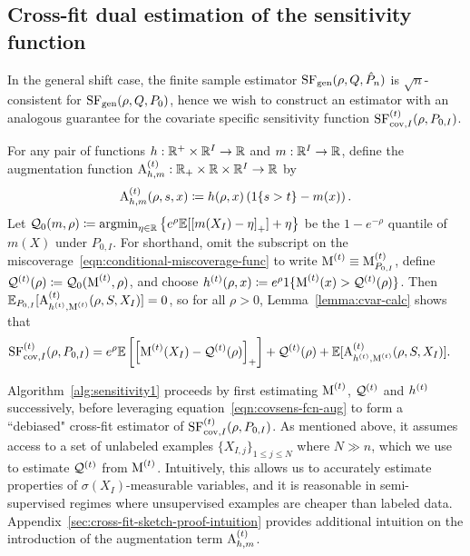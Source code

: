 \subsection{Cross-fit dual estimation of the sensitivity function}
\label{subsec:sens-f-inf-divergence}

In the general shift case, the finite sample estimator $\operatorname*{SF}_\text{gen}(\rho,Q,\hat{P}_n)$ is $\sqrt{n}$-consistent for $\operatorname*{SF}_\text{gen}(\rho,Q,P_0)$,  hence we wish to construct an estimator with an analogous guarantee for the covariate specific sensitivity function ${\operatorname*{SF}}_{\textup{cov}, I}^{(t)}(\rho, P_{0,I})$.

For any pair of functions $h : \mathbb{R}^+ \times \mathbb{R}^I \to
\mathbb{R}$ and $m: \mathbb{R}^I \to \mathbb{R}$, define the augmentation function
$\textrm{A}^{(t)}_{h,m} : \mathbb{R}_+ \times \mathbb{R} \times \mathbb{R}^I \to \mathbb{R}$ by
\begin{align*}
  \textrm{A}^{(t)}_{h,m}(\rho,  s,  x)
  \coloneqq h(\rho, x) \left(1\!\left\{s>t\right\}- m(x) \right).
\end{align*}
Let $\mathcal{Q}_0(m,\rho) \coloneqq \mathop{\rm argmin}_{\eta \in \mathbb{R}}
\big\{e^{\rho}\mathbb{E}[\left[{m(X_I)-\eta}\right]_+] +\eta \big\}$ be the $1-e^{-\rho}$
quantile of $m(X)$ under $P_{0,I}$.  For shorthand, omit the subscript on
the miscoverage~\eqref{eqn:conditional-miscoverage-func} to write
${\operatorname*{M}}^{(t)} \equiv {\operatorname*{M}}_{P_{0,I}}^{(t)}$, define $\mathcal{Q}^{(t)}(\rho)
\coloneqq \mathcal{Q}_0({\operatorname*{M}}^{(t)},\rho)$, and choose
$h^{(t)}(\rho, x) \coloneqq
e^{\rho}1\{{\operatorname*{M}}^{(t)}(x)>
  \mathcal{Q}^{(t)}(\rho)\}$.  Then
$\mathbb{E}_{P_{0,I}}[\textrm{A}^{(t)}_{h^{(t)},
    {\operatorname*{M}}^{(t)}}(\rho, S, X_I)] = 0$, so for all $\rho
>0$, Lemma~\ref{lemma:cvar-calc} shows that
\begin{align}
  \label{eqn:covsens-fcn-aug}
  {\operatorname*{SF}}_{\textup{cov}, I}^{(t)} (\rho, P_{0,I}) &= e^{\rho} \mathbb{E}\left[
    \left[{{\operatorname*{M}}^{(t)}(X_I)- \mathcal{Q}^{(t)}(\rho)}\right]_+\right]
  +\mathcal{Q}^{(t)}(\rho) +
  \mathbb{E}[\textrm{A}^{(t)}_{h^{(t)}, {\operatorname*{M}}^{(t)}}(\rho, S,  X_I)].
\end{align}

Algorithm~\ref{alg:sensitivity1} proceeds by first estimating
$\operatorname*{M}^{(t)}$, $\mathcal{Q}^{(t)}$ and
$h^{(t)}$ successively, before leveraging
equation~\eqref{eqn:covsens-fcn-aug} to form a ``debiased" cross-fit
estimator of ${\operatorname*{SF}}_{\textup{cov}, I}^{(t)} (\rho, P_{0,I})$.  As mentioned above, it assumes
access to a set of unlabeled examples $\{ X_{I,j} \}_{1\le j \le N}$ where
$N \gg n$, which we use to estimate $\mathcal{Q}^{(t)}$ from
${\operatorname*{M}}^{(t)}$. Intuitively, this allows us to accurately
estimate properties of $\sigma(X_I)$-measurable variables, and it is
reasonable in semi-supervised regimes where unsupervised examples are cheaper than labeled data.  Appendix~\ref{sec:cross-fit-sketch-proof-intuition} provides additional intuition on the introduction of the augmentation term $\textrm{A}^{(t)}_{h,m}$.


